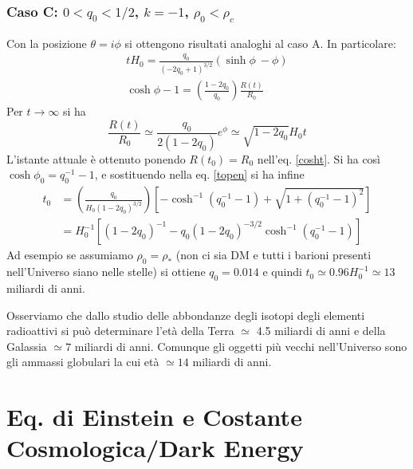 \subsubsection{Caso C: $0< q_0 < 1/2$, $k=-1$, $\rho_0 < \rho_c$}

Con la posizione $\theta = i \phi$ si ottengono risultati analoghi al caso A.
In particolare:
\begin{gather}
  t H_0= \frac {q_0}{(-2q_0+1)^{3/2}} \left( \sinh \phi \ - \phi \right)
  \label{topen} \\
  \cosh \phi -1 = \left( \frac {1-2q_0}{q_0} \right) \frac {R(t)}{R_0}
  \label{cosht}
\end{gather}
Per $t \to \infty$ si ha
\begin{equation}
  \frac{R(t)}{R_0} \simeq \frac {q_0}{2(1-2q_0)} e^{\phi} \simeq \sqrt{1-2q_0}
  H_0 t
\end{equation}
L'istante attuale è ottenuto ponendo $R(t_0)= R_0$ nell'eq. \eqref{cosht}.  Si
ha così $\cosh \phi_0= q_0^{-1}-1$, e sostituendo nella eq. \eqref{topen} si ha
infine
\begin{equation}
  \begin{split}
    t_0 &= \left(\frac {q_0}{H_0 (1-2q_0)^{3/2}} \right)
    \left[- \cosh^{-1} (q_0^{-1}-1) + \sqrt{1+(q_0^{-1}-1)^2} \right] \\
    &= H_0^{-1} \left[ (1-2q_0)^{-1} - q_0 (1-2q_0)^{-3/2} \cosh^{-1}
      (q_0^{-1}-1) \right]
  \end{split}
\end{equation}
Ad esempio se assumiamo $\rho_0 =\rho_*$ (non ci sia DM e tutti i barioni
presenti nell'Universo siano nelle stelle) si ottiene $q_0 = 0.014$ e quindi
$t_0 \simeq 0.96 H_0^{-1} \simeq 13$ miliardi di anni.

Osserviamo che dallo studio delle abbondanze degli isotopi degli elementi
radioattivi si può determinare l'età della Terra $\simeq $ 4.5 miliardi di anni
e della Galassia $\simeq 7$ miliardi di anni.  Comunque gli oggetti più vecchi
nell'Universo sono gli ammassi globulari la cui età $\simeq 14$ miliardi di
anni.

\section{Eq. di Einstein e Costante Cosmologica/Dark Energy}

